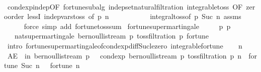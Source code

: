 \begin{isabellebody}
\ \ \ \ \isamarkupfalse%
\ cond{\isacharunderscore}{\kern0pt}exp{\isacharunderscore}{\kern0pt}indep{\isacharbrackleft}{\kern0pt}OF\ fortune{\isachardot}{\kern0pt}subalg\ indep{\isacharunderscore}{\kern0pt}set{\isacharunderscore}{\kern0pt}natural{\isacharunderscore}{\kern0pt}filtration\ integrable{\isacharunderscore}{\kern0pt}toss{\isacharcomma}{\kern0pt}\ OF\ zero{\isacharunderscore}{\kern0pt}order{\isacharparenleft}{\kern0pt}{}{\isacharparenright}{\kern0pt}\ lessI\ indep{\isacharunderscore}{\kern0pt}vars{\isacharunderscore}{\kern0pt}toss{\isacharcomma}{\kern0pt}\ of\ p\ n{\isacharbrackright}{\kern0pt}\ \isanewline
\ \ \ \ \ \ \ \ \ \ integral{\isacharunderscore}{\kern0pt}toss{\isacharbrackleft}{\kern0pt}of\ p\ {\isachardoublequoteopen}Suc\ n{\isachardoublequoteclose}{\isacharbrackright}{\kern0pt}\ assms\isanewline
\ \ \ \ \isamarkupfalse%
\ {\isacharparenleft}{\kern0pt}force\ simp\ add{\isacharcolon}{\kern0pt}\ fortune{\isacharunderscore}{\kern0pt}toss{\isacharunderscore}{\kern0pt}sum{\isacharparenright}{\kern0pt}\isanewline
{}\isamarkupfalse%
%
\endisatagproof
{\isafoldproof}%
%
\isadelimproof
\isanewline
%
\endisadelimproof
\isanewline
{}\isamarkupfalse%
\ fortune{\isacharunderscore}{\kern0pt}supermartingale{\isacharcolon}{\kern0pt}\isanewline
\ \ \ {\isachardoublequoteopen}{}\ {\isasymle}\ p{\isachardoublequoteclose}\ {\isachardoublequoteopen}p\ {\isasymle}\ {}{\isacharslash}{\kern0pt}{}{\isachardoublequoteclose}\ \isanewline
\ \ \ {\isachardoublequoteopen}nat{\isacharunderscore}{\kern0pt}supermartingale\ {\isacharparenleft}{\kern0pt}bernoulli{\isacharunderscore}{\kern0pt}stream\ p{\isacharparenright}{\kern0pt}\ {\isacharparenleft}{\kern0pt}toss{\isacharunderscore}{\kern0pt}filtration\ p{\isacharparenright}{\kern0pt}\ fortune{\isachardoublequoteclose}\isanewline
%
\isadelimproof
%
\endisadelimproof
%
\isatagproof
{}\isamarkupfalse%
\ {\isacharparenleft}{\kern0pt}intro\ fortune{\isachardot}{\kern0pt}supermartingale{\isacharunderscore}{\kern0pt}of{\isacharunderscore}{\kern0pt}cond{\isacharunderscore}{\kern0pt}exp{\isacharunderscore}{\kern0pt}diff{\isacharunderscore}{\kern0pt}Suc{\isacharunderscore}{\kern0pt}le{\isacharunderscore}{\kern0pt}zero\ integrable{\isacharunderscore}{\kern0pt}fortune{\isacharparenright}{\kern0pt}\isanewline
\ \ \isamarkupfalse%
\ n\isanewline
\ \ \isamarkupfalse%
\ {\isachardoublequoteopen}AE\ {\isasymxi}\ in\ bernoulli{\isacharunderscore}{\kern0pt}stream\ p{\isachardot}{\kern0pt}\ {}\ {\isasymge}\ cond{\isacharunderscore}{\kern0pt}exp\ {\isacharparenleft}{\kern0pt}bernoulli{\isacharunderscore}{\kern0pt}stream\ p{\isacharparenright}{\kern0pt}\ {\isacharparenleft}{\kern0pt}toss{\isacharunderscore}{\kern0pt}filtration\ p\ n{\isacharparenright}{\kern0pt}\ {\isacharparenleft}{\kern0pt}{\isasymlambda}{\isasymxi}{\isachardot}{\kern0pt}\ fortune\ {\isacharparenleft}{\kern0pt}Suc\ n{\isacharparenright}{\kern0pt}\ {\isasymxi}\ {\isacharminus}{\kern0pt}\ fortune\ n\ {\isasymxi}{\isacharparenright}{\kern0pt}\ {\isasymxi}{\isachardoublequoteclose}\isanewline

\end{isabellebody}
